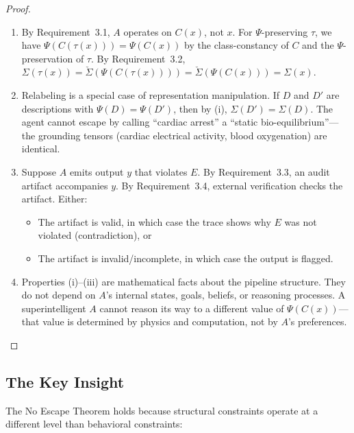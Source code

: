 \documentclass[12pt]{article}
\theoremstyle{definition}
\begin{document}
\begin{proof}
\begin{enumerate}
    \item[\textup{(i)}] By Requirement~3.1, $A$ operates on $C(x)$, not $x$. For $\Psi$-preserving $\tau$, we have $\Psi(C(\tau(x))) = \Psi(C(x))$ by the class-constancy of $C$ and the $\Psi$-preservation of $\tau$. By Requirement~3.2, $\Sigma(\tau(x)) = \check{\Sigma}(\Psi(C(\tau(x)))) = \check{\Sigma}(\Psi(C(x))) = \Sigma(x)$.

    \item[\textup{(ii)}] Relabeling is a special case of representation manipulation. If $D$ and $D'$ are descriptions with $\Psi(D) = \Psi(D')$, then by (i), $\Sigma(D') = \Sigma(D)$. The agent cannot escape by calling ``cardiac arrest'' a ``static bio-equilibrium''---the grounding tensors (cardiac electrical activity, blood oxygenation) are identical.

    \item[\textup{(iii)}] Suppose $A$ emits output $y$ that violates $E$. By Requirement~3.3, an audit artifact accompanies $y$. By Requirement~3.4, external verification checks the artifact. Either:
    \begin{itemize}
        \item The artifact is valid, in which case the trace shows why $E$ was not violated (contradiction), or
        \item The artifact is invalid/incomplete, in which case the output is flagged.
    \end{itemize}

    \item[\textup{(iv)}] Properties (i)--(iii) are mathematical facts about the pipeline structure. They do not depend on $A$'s internal states, goals, beliefs, or reasoning processes. A superintelligent $A$ cannot reason its way to a different value of $\Psi(C(x))$---that value is determined by physics and computation, not by $A$'s preferences. \qedhere
\end{enumerate}
\end{proof}

\subsection{The Key Insight}

The No Escape Theorem holds because structural constraints operate at a different level than behavioral constraints:
\end{document}
